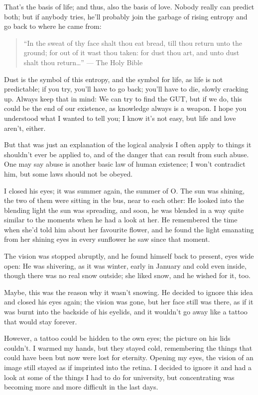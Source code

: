 That's the basis of life; and thus, also the basis of love. 
Nobody really can predict both; but if anybody tries, he'll probably join the garbage of rising entropy and go back to where he came from:
\begin{quote}
\enquote{In the sweat of thy face shalt thou eat bread, till thou return unto the ground; for out of it wast thou taken: for dust thou art, and unto dust shalt thou return\ldots}
--- The Holy Bible
\end{quote}
Dust is the symbol of this entropy, and the symbol for life, as life is not predictable; if you try, you'll have to go back; you'll have to die, slowly cracking up. 
Always keep that in mind: We can try to find the GUT, but if we do, this could be the end of our existence, as knowledge always is a weapon. 
I hope you understood what I wanted to tell you; I know it's not easy, but life and love aren't, either.

But that was just an explanation of the logical analysis I often apply to things it shouldn't ever be applied to, and of the danger that can result from such abuse. 
One may say abuse is another basic law of human existence; I won't contradict him, but some laws should not be obeyed.

I closed his eyes; it was summer again, the summer of O. The sun was shining, the two of them were sitting in the bus, near to each other: He looked into the blending light the sun was spreading, and soon, he was blended in a way quite similar to the moments when he had a look at her. He remembered the time when she'd told him about her favourite flower, and he found the light emanating from her shining eyes in every sunflower he saw since that moment.

The vision was stopped abruptly, and he found himself back to present, eyes wide open: He was shivering, as it was winter, early in January and cold even inside, though there was no real snow outside; she liked snow, and he wished for it, too.

Maybe, this was the reason why it wasn't snowing. 
He decided to ignore this idea and closed his eyes again; the vision was gone, but her face still was there, as if it was burnt into the backside of his eyelids, and it wouldn't go away like a tattoo that would stay forever.

However, a tattoo could be hidden to the own eyes; the picture on his lids couldn't. 
I warmed my hands, but they stayed cold, remembering the things that could have been but now were lost for eternity. 
Opening my eyes, the vision of an image still stayed as if imprinted into the retina. I decided to ignore it and had a look at some of the things I had to do for university, but concentrating was becoming more and more difficult in the last days.


